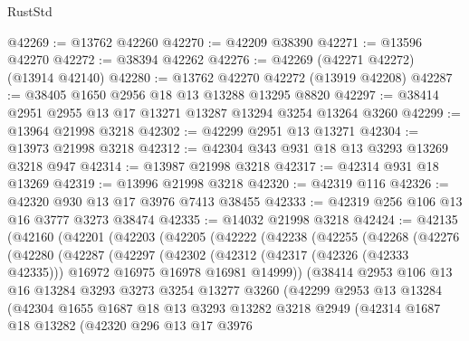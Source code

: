 \begin{lexlean}{RustStd}
\begin{coremodule}
@42269 := @13762 @42260
@42270 := @42209 @38390
@42271 := @13596 @42270
@42272 := @38394 @42262
@42276 := @42269 (@42271 @42272) (@13914 @42140)
@42280 := @13762 @42270 @42272 (@13919 @42208)
@42287 := @38405 @1650 @2956 @18 @13 @13288 @13295 @8820
@42297 := @38414 @2951 @2955 @13 @17 @13271 @13287 @13294 @3254 @13264 @3260
@42299 := @13964 @21998 @3218
@42302 := @42299 @2951 @13 @13271
@42304 := @13973 @21998 @3218
@42312 := @42304 @343 @931 @18 @13 @3293 @13269 @3218 @947
@42314 := @13987 @21998 @3218
@42317 := @42314 @931 @18 @13269
@42319 := @13996 @21998 @3218
@42320 := @42319 @116
@42326 := @42320 @930 @13 @17 @3976 @7413 @38455
@42333 := @42319 @256 @106 @13 @16 @3777 @3273 @38474
@42335 := @14032 @21998 @3218
@42424 := @42135
    (@42160
      (@42201
        (@42203
          (@42205
            (@42222
              (@42238
                (@42255
                  (@42268
                    (@42276
                      (@42280
                        (@42287
                          (@42297
                            (@42302
                              (@42312
                                (@42317 (@42326 (@42333 @42335)))
                                @16972
                                @16975
                                @16978
                                @16981
                                @14999))
                            (@38414
                              @2953
                              @106
                              @13
                              @16
                              @13284
                              @3293
                              @3273
                              @3254
                              @13277
                              @3260
                              (@42299
                                @2953
                                @13
                                @13284
                                (@42304
                                  @1655
                                  @1687
                                  @18
                                  @13
                                  @3293
                                  @13282
                                  @3218
                                  @2949
                                  (@42314
                                    @1687
                                    @18
                                    @13282
                                    (@42320
                                      @296
                                      @13
                                      @17
                                      @3976

\end{coremodule}
\end{lexlean}
